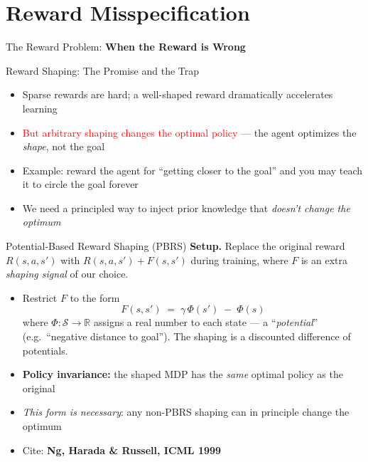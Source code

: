 \section{Reward Misspecification}

\begin{frame}{}
    \LARGE The Reward Problem: \textbf{When the Reward is Wrong}
\end{frame}

\begin{frame}{Reward Shaping: The Promise and the Trap}
\begin{itemize}
    \setlength{\itemsep}{0.6em}
    \item Sparse rewards are hard; a well-shaped reward dramatically accelerates learning
    \item \textcolor{red}{But arbitrary shaping changes the optimal policy} --- the agent optimizes the \emph{shape}, not the goal
    \item Example: reward the agent for ``getting closer to the goal'' and you may teach it to circle the goal forever
    \item We need a principled way to inject prior knowledge that \emph{doesn't change the optimum}
\end{itemize}
\end{frame}

\begin{frame}{Potential-Based Reward Shaping (PBRS)}
\textbf{Setup.} Replace the original reward $R(s, a, s')$ with $R(s, a, s') + F(s, s')$ during training, where $F$ is an extra \emph{shaping signal} of our choice.
\vspace{0.4em}
\begin{itemize}
    \setlength{\itemsep}{0.55em}
    \item Restrict $F$ to the form
    \[
        F(s, s') \;=\; \gamma\, \Phi(s') \;-\; \Phi(s)
    \]
    where $\Phi : \mathcal{S} \to \mathbb{R}$ assigns a real number to each state --- a ``\emph{potential}'' (e.g.\ ``negative distance to goal''). The shaping is a discounted difference of potentials.
    \item \textbf{Policy invariance:} the shaped MDP has the \emph{same} optimal policy as the original
    \item \emph{This form is necessary}: any non-PBRS shaping can in principle change the optimum
    \item Cite: \textbf{Ng, Harada \& Russell, ICML 1999}
\end{itemize}
\end{frame}

